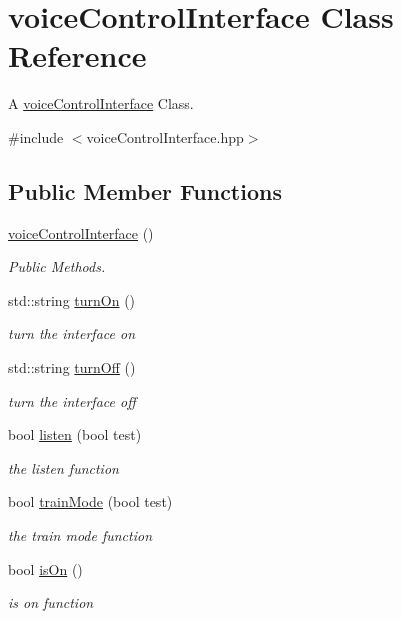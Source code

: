 \hypertarget{classvoiceControlInterface}{}\section{voice\+Control\+Interface Class Reference}
\label{classvoiceControlInterface}


A \hyperlink{classvoiceControlInterface}{voice\+Control\+Interface} Class.  




{\ttfamily \#include $<$voice\+Control\+Interface.\+hpp$>$}

\subsection*{Public Member Functions}
\begin{DoxyCompactItemize}
\item 
\hyperlink{classvoiceControlInterface_a06e2ebd023387d744fd176b08a2166be}{voice\+Control\+Interface} ()
\begin{DoxyCompactList}\small\item\em Public Methods. \end{DoxyCompactList}\item 
std\+::string \hyperlink{classvoiceControlInterface_af8b69e2a1fdb0f964ad7ec2f94cbb3dd}{turn\+On} ()
\begin{DoxyCompactList}\small\item\em turn the interface on \end{DoxyCompactList}\item 
std\+::string \hyperlink{classvoiceControlInterface_a42c601ff64847d197537b056470ee4b3}{turn\+Off} ()
\begin{DoxyCompactList}\small\item\em turn the interface off \end{DoxyCompactList}\item 
bool \hyperlink{classvoiceControlInterface_a58ad88c00cce22b0b0acf68a88dae0ff}{listen} (bool test)
\begin{DoxyCompactList}\small\item\em the listen function \end{DoxyCompactList}\item 
bool \hyperlink{classvoiceControlInterface_affc4b701fcc41b5839383dac82381ef4}{train\+Mode} (bool test)
\begin{DoxyCompactList}\small\item\em the train mode function \end{DoxyCompactList}\item 
bool \hyperlink{classvoiceControlInterface_a6152249383eca74e1a0da2ddbeab1069}{is\+On} ()
\begin{DoxyCompactList}\small\item\em is on function \end{DoxyCompactList}\end{DoxyCompactItemize}


